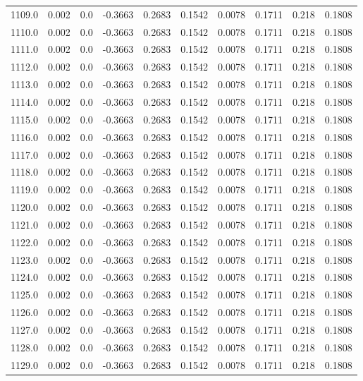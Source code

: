\begin{longtable}{lrrrrrrrrr}
1109.0 & 0.002 & 0.0 & -0.3663 & 0.2683 & 0.1542 & 0.0078 & 0.1711 & 0.218 & 0.1808 \\
1110.0 & 0.002 & 0.0 & -0.3663 & 0.2683 & 0.1542 & 0.0078 & 0.1711 & 0.218 & 0.1808 \\
1111.0 & 0.002 & 0.0 & -0.3663 & 0.2683 & 0.1542 & 0.0078 & 0.1711 & 0.218 & 0.1808 \\
1112.0 & 0.002 & 0.0 & -0.3663 & 0.2683 & 0.1542 & 0.0078 & 0.1711 & 0.218 & 0.1808 \\
1113.0 & 0.002 & 0.0 & -0.3663 & 0.2683 & 0.1542 & 0.0078 & 0.1711 & 0.218 & 0.1808 \\
1114.0 & 0.002 & 0.0 & -0.3663 & 0.2683 & 0.1542 & 0.0078 & 0.1711 & 0.218 & 0.1808 \\
1115.0 & 0.002 & 0.0 & -0.3663 & 0.2683 & 0.1542 & 0.0078 & 0.1711 & 0.218 & 0.1808 \\
1116.0 & 0.002 & 0.0 & -0.3663 & 0.2683 & 0.1542 & 0.0078 & 0.1711 & 0.218 & 0.1808 \\
1117.0 & 0.002 & 0.0 & -0.3663 & 0.2683 & 0.1542 & 0.0078 & 0.1711 & 0.218 & 0.1808 \\
1118.0 & 0.002 & 0.0 & -0.3663 & 0.2683 & 0.1542 & 0.0078 & 0.1711 & 0.218 & 0.1808 \\
1119.0 & 0.002 & 0.0 & -0.3663 & 0.2683 & 0.1542 & 0.0078 & 0.1711 & 0.218 & 0.1808 \\
1120.0 & 0.002 & 0.0 & -0.3663 & 0.2683 & 0.1542 & 0.0078 & 0.1711 & 0.218 & 0.1808 \\
1121.0 & 0.002 & 0.0 & -0.3663 & 0.2683 & 0.1542 & 0.0078 & 0.1711 & 0.218 & 0.1808 \\
1122.0 & 0.002 & 0.0 & -0.3663 & 0.2683 & 0.1542 & 0.0078 & 0.1711 & 0.218 & 0.1808 \\
1123.0 & 0.002 & 0.0 & -0.3663 & 0.2683 & 0.1542 & 0.0078 & 0.1711 & 0.218 & 0.1808 \\
1124.0 & 0.002 & 0.0 & -0.3663 & 0.2683 & 0.1542 & 0.0078 & 0.1711 & 0.218 & 0.1808 \\
1125.0 & 0.002 & 0.0 & -0.3663 & 0.2683 & 0.1542 & 0.0078 & 0.1711 & 0.218 & 0.1808 \\
1126.0 & 0.002 & 0.0 & -0.3663 & 0.2683 & 0.1542 & 0.0078 & 0.1711 & 0.218 & 0.1808 \\
1127.0 & 0.002 & 0.0 & -0.3663 & 0.2683 & 0.1542 & 0.0078 & 0.1711 & 0.218 & 0.1808 \\
1128.0 & 0.002 & 0.0 & -0.3663 & 0.2683 & 0.1542 & 0.0078 & 0.1711 & 0.218 & 0.1808 \\
1129.0 & 0.002 & 0.0 & -0.3663 & 0.2683 & 0.1542 & 0.0078 & 0.1711 & 0.218 & 0.1808 \\

\end{longtable}
